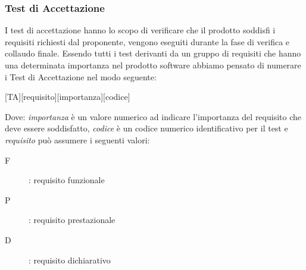 \documentclass[../piano-di-qualifica.tex]{subfiles}
\begin{document}
  \subsubsection{Test di Accettazione}
  \label{subs:accettazione}
      I test di accettazione hanno lo scopo di verificare che il prodotto soddisfi i requisiti richiesti dal proponente, vengono eseguiti durante la fase di verifica e collaudo finale.
      Essendo tutti i test derivanti da un gruppo di requisiti che hanno una determinata importanza nel prodotto software abbiamo pensato di numerare i Test di Accettazione nel modo seguente:
      \begin{center}
          [TA][requisito][importanza][codice]
      \end{center}
      Dove: \textit{importanza} è un valore numerico ad indicare l'importanza del requisito che deve essere soddisfatto, \textit{codice} è un codice numerico identificativo per il test e \textit{requisito} può assumere i seguenti valori:
      \begin{description}
        \item [F]: requisito funzionale 
        \item [P]: requisito prestazionale
        \item [D]: requisito dichiarativo
      \end{description}
\end{document}
